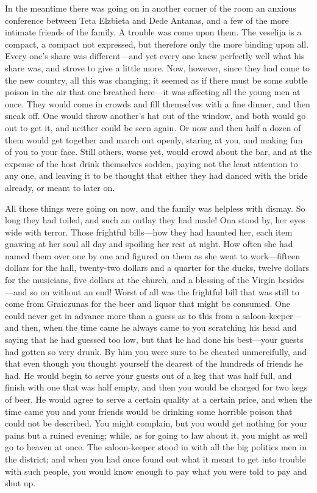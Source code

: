 \documentclass[
]{book}
\theoremstyle{definition}
\theoremstyle{definition}
\theoremstyle{definition}
\theoremstyle{definition}
\theoremstyle{remark}
\begin{document}
In the meantime there was going on in another corner of the room an anxious conference between Teta Elzbieta and Dede Antanas, and a few of the more intimate friends of the family. A trouble was come upon them. The veselija is a compact, a compact not expressed, but therefore only the more binding upon all. Every one's share was different---and yet every one knew perfectly well what his share was, and strove to give a little more. Now, however, since they had come to the new country, all this was changing; it seemed as if there must be some subtle poison in the air that one breathed here---it was affecting all the young men at once. They would come in crowds and fill themselves with a fine dinner, and then sneak off. One would throw another's hat out of the window, and both would go out to get it, and neither could be seen again. Or now and then half a dozen of them would get together and march out openly, staring at you, and making fun of you to your face. Still others, worse yet, would crowd about the bar, and at the expense of the host drink themselves sodden, paying not the least attention to any one, and leaving it to be thought that either they had danced with the bride already, or meant to later on.

All these things were going on now, and the family was helpless with dismay. So long they had toiled, and such an outlay they had made! Ona stood by, her eyes wide with terror. Those frightful bills---how they had haunted her, each item gnawing at her soul all day and spoiling her rest at night. How often she had named them over one by one and figured on them as she went to work---fifteen dollars for the hall, twenty-two dollars and a quarter for the ducks, twelve dollars for the musicians, five dollars at the church, and a blessing of the Virgin besides---and so on without an end! Worst of all was the frightful bill that was still to come from Graiczunas for the beer and liquor that might be consumed. One could never get in advance more than a guess as to this from a saloon-keeper---and then, when the time came he always came to you scratching his head and saying that he had guessed too low, but that he had done his best---your guests had gotten so very drunk. By him you were sure to be cheated unmercifully, and that even though you thought yourself the dearest of the hundreds of friends he had. He would begin to serve your guests out of a keg that was half full, and finish with one that was half empty, and then you would be charged for two kegs of beer. He would agree to serve a certain quality at a certain price, and when the time came you and your friends would be drinking some horrible poison that could not be described. You might complain, but you would get nothing for your pains but a ruined evening; while, as for going to law about it, you might as well go to heaven at once. The saloon-keeper stood in with all the big politics men in the district; and when you had once found out what it meant to get into trouble with such people, you would know enough to pay what you were told to pay and shut up.
\end{document}

